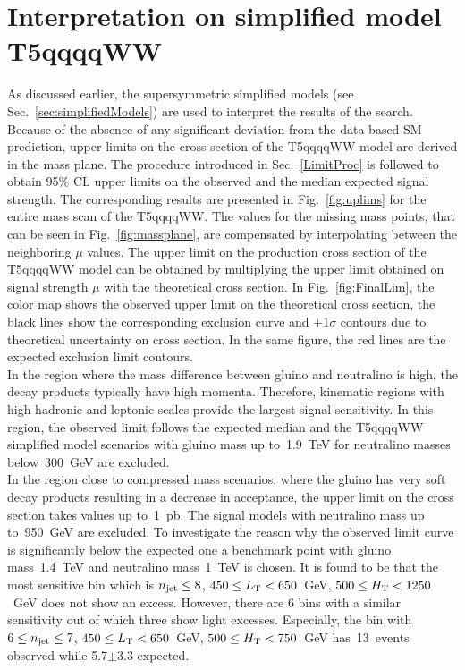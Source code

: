 \section{Interpretation on simplified model T5qqqqWW}
As discussed earlier, the supersymmetric simplified models (see Sec.~\ref{sec:simplifiedModels}) are used to interpret the results of the search. Because of the absence of any significant deviation from the data-based SM prediction, upper limits  on the cross section of the T5qqqqWW model are derived in the mass plane.  
The procedure introduced in Sec.~\ref{LimitProc} is followed to obtain 95\% CL upper limits on the observed and the median expected signal strength. The corresponding results are presented in Fig.~\ref{fig:uplims} for the entire mass scan of the T5qqqqWW. The values for the missing mass points, that can be seen in Fig.~\ref{fig:massplane}, are compensated by interpolating between the neighboring $\mu$ values.
The upper limit on the production cross section of the T5qqqqWW model can be obtained by multiplying the upper limit obtained on signal strength $\mu$ with the theoretical cross section.
In Fig.~\ref{fig:FinalLim}, the color map shows the observed upper limit on the theoretical cross section, the black lines show the corresponding exclusion curve and $\pm$1$\sigma$ contours due to theoretical uncertainty on cross section. In the same figure, the red lines are the expected exclusion limit contours. \\
In the region where the mass difference between gluino and neutralino is high, the decay products typically have high momenta. Therefore, kinematic regions with high hadronic and leptonic scales provide the largest signal sensitivity. In this region, the observed limit follows the expected median and the T5qqqqWW simplified model scenarios with gluino mass up to~1.9~TeV for neutralino masses below~300~GeV  are excluded. \\
In the region close to compressed mass scenarios, where the gluino has very soft decay products resulting in a decrease in acceptance, the upper limit on the cross section takes values up to~1~pb. The signal  models with neutralino mass up to~950~GeV are excluded.
To investigate the reason why the observed limit curve is significantly below the expected one a benchmark point with gluino mass~1.4~TeV and neutralino mass~1~TeV is chosen. It is found to be that the most sensitive bin which is $n_{\rm jet} \leq 8$, $450\leq L_{\rm T}<650$~GeV, $500\leq H_{\rm T}<1250$~GeV does not show an excess. However, there are 6 bins with a similar sensitivity out of which three show light excesses. Especially, the bin with $6\leq n_{\rm jet}\leq7$, $450\leq L_{\rm T}<650$~GeV, $500\leq H_{\rm T}<750$~GeV has~13~events observed while 5.7$\pm$3.3 expected.
